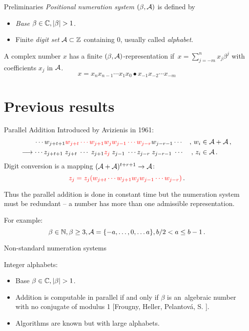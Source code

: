   {Preliminaries}
  \textit{Positional numeration system} $(\beta, \mathcal{A})$ is defined by
  \begin{itemize}
    \item \textit{Base} $\beta \in \CC, |\beta|>1$.
    \item Finite \textit{digit set}  $\mathcal{A} \subset \mathbb{Z}$ containing 0, usually called \textit{alphabet}.
  \end{itemize} 

  
  A complex number $x$ has a finite  $(\beta, \mathcal{A})$-representation if~$x=\sum_{j=-m}^n x_j \beta^j$ with coefficients $x_j$ in $\mathcal{A}$.
  $$
    x=x_n x_{n-1}\cdots x_1 x_0 \bullet x_{-1} x_{-2} \cdots x_{-m}
  $$
  
  
 \section{Previous results}
 
    {Parallel Addition}
    Introduced by Avizienis in 1961:
  \begin{align*}
    \cdots w_{j+t+1}\textcolor{red}{w_{j+t} \cdots w_{j+1}}& \textcolor{red}{w_j w_{j-1} \cdots w_{j-r}}w_{j-r-1} \cdots &,\, w_i &\in \mathcal{A} + \mathcal{A}\,,    \\
    \longrightarrow \cdots z_{j+t+1}\;z_{j+t} \; \cdots \; z_{j+1} &\textcolor{red}{z_j} \; z_{j-1}\; \cdots z_{j-r}\;z_{j-r-1}\; \cdots &,\, z_i &\in \mathcal{A}\,.
  \end{align*}
  Digit conversion is a mapping $(\mathcal{A}+\mathcal{A})^{t+r+1} \to \mathcal{A}$:%
  $$
    \textcolor{red}{z_j=z_j(w_{j+t} \cdots w_{j+1}w_j w_{j-1} \cdots w_{j-r})}\,.
  $$
  
  Thus the parallel addition is done in constant time but the numeration system must be redundant -- a number has more than one admissible representation.
  
  
  For example:
  $$
  \beta \in \mathbb{N}, \beta \geq 3, \mathcal{A}=\{-a, \dots, 0, \dots a\}, b/2 <a \leq b-1\,. 
  $$
    
    
    
        {Non-standard numeration systems}
    
    Integer alphabets:
    \begin{itemize}
        \item Base $\beta \in \CC, |\beta|>1$.
        
        \item Addition is computable in parallel if and only if $\beta$ is an~algebraic number with no conjugate of modulus 1 [Frougny, Heller, Pelantov\'a, S. ].
        
        \item Algorithms are known but with large alphabets.
    \end{itemize}
    
